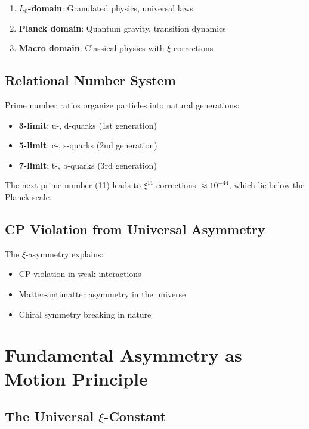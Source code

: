 \documentclass[12pt,a4paper]{article}
\newcommand{\xipar}{\xi}
\newcommand{\Lzero}{L_0}
\theoremstyle{definition}
\theoremstyle{remark}
\begin{document}
	\begin{enumerate}
		\item \textbf{$\Lzero$-domain}: Granulated physics, universal laws
		\item \textbf{Planck domain}: Quantum gravity, transition dynamics
		\item \textbf{Macro domain}: Classical physics with $\xipar$-corrections
	\end{enumerate}
	
	\subsection{Relational Number System}
	
	Prime number ratios organize particles into natural generations:
	
	\begin{itemize}
		\item \textbf{3-limit}: u-, d-quarks (1st generation)
		\item \textbf{5-limit}: c-, s-quarks (2nd generation)
		\item \textbf{7-limit}: t-, b-quarks (3rd generation)
	\end{itemize}
	
	The next prime number (11) leads to $\xipar^{11}$-corrections $\approx 10^{-44}$, which lie below the Planck scale.
	
	\subsection{CP Violation from Universal Asymmetry}
	
	The $\xipar$-asymmetry explains:
	\begin{itemize}
		\item CP violation in weak interactions
		\item Matter-antimatter asymmetry in the universe
		\item Chiral symmetry breaking in nature
	\end{itemize}
	
	\section{Fundamental Asymmetry as Motion Principle}
	
	\subsection{The Universal $\xipar$-Constant}
	
\end{document}
